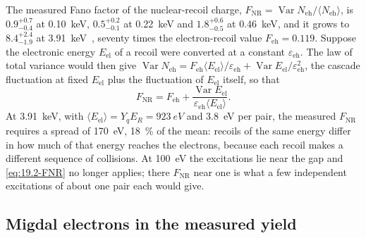 The measured Fano factor of the nuclear-recoil charge, $F_{\mathrm{NR}} = \operatorname{Var}N_{\mathrm{eh}}/\langle N_{\mathrm{eh}}\rangle$, is $0.9^{+0.7}_{-0.4}$ at \SI{0.10}{keV}, $0.5^{+0.2}_{-0.1}$ at \SI{0.22}{keV} and $1.8^{+0.6}_{-0.5}$ at \SI{0.46}{keV}, and it grows to $8.4^{+2.4}_{-1.9}$ at \SI{3.91}{keV}~\cite[Table~II]{albakry2023first}, seventy times the electron-recoil value $F_{\mathrm{eh}} = 0.119$. Suppose the electronic energy $E_{\mathrm{el}}$ of a recoil were converted at a constant $\varepsilon_{\mathrm{eh}}$. The law of total variance would then give $\operatorname{Var}N_{\mathrm{eh}} = F_{\mathrm{eh}}\langle E_{\mathrm{el}}\rangle/\varepsilon_{\mathrm{eh}} + \operatorname{Var}E_{\mathrm{el}}/\varepsilon_{\mathrm{eh}}^2$, the cascade fluctuation at fixed $E_{\mathrm{el}}$ plus the fluctuation of $E_{\mathrm{el}}$ itself, so that
\begin{equation}
  F_{\mathrm{NR}} = F_{\mathrm{eh}} + \frac{\operatorname{Var}E_{\mathrm{el}}}{\varepsilon_{\mathrm{eh}}\langle E_{\mathrm{el}}\rangle} .
  \label{eq:19.2-FNR}
\end{equation}
At \SI{3.91}{keV}, with $\langle E_{\mathrm{el}}\rangle = Y_qE_R = \SI{923}{eV}$ and \SI{3.8}{eV} per pair, the measured $F_{\mathrm{NR}}$ requires a spread of \SI{170}{eV}, \SI{18}{\percent} of the mean: recoils of the same energy differ in how much of that energy reaches the electrons, because each recoil makes a different sequence of collisions. At \SI{100}{eV} the excitations lie near the gap and \cref{eq:19.2-FNR} no longer applies; there $F_{\mathrm{NR}}$ near one is what a few independent excitations of about one pair each would give.

\subsection{Migdal electrons in the measured yield}\label{sec:19.2-migdal}

